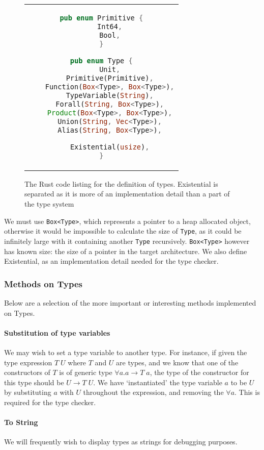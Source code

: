 \begin{figure}[ht]
    \centering
    \begin{tabular}{c}
    \begin{lstlisting}[language=Rust]
pub enum Primitive {
    Int64,
    Bool,
}

pub enum Type {
    Unit,
    Primitive(Primitive),
    Function(Box<Type>, Box<Type>),
    TypeVariable(String),
    Forall(String, Box<Type>),
    Product(Box<Type>, Box<Type>),
    Union(String, Vec<Type>),
    Alias(String, Box<Type>),

    Existential(usize),
}
    \end{lstlisting}
    \end{tabular}
    \caption{The Rust code listing for the definition of types. Existential is separated as it is more of an implementation detail than a part of the type system}
    \label{fig:type_lst}
\end{figure}

We must use \verb|Box<Type>|, which represents a pointer to a heap allocated object, otherwise it would be impossible to calculate the size of \verb|Type|, as it could be infinitely large with it containing another \verb|Type| recursively. \verb|Box<Type>| however has known size: the size of a pointer in the target architecture. We also define Existential, as an implementation detail needed for the type checker. 

\subsubsection{Methods on Types}
Below are a selection of the more important or interesting methods implemented on Types.

\paragraph{Substitution of type variables} We may wish to set a type variable to another type. For instance, if given the type expression \(T \; U\) where \(T\) and \(U\) are types, and we know that one of the constructors of \(T\) is of generic type \(\forall a.a \rightarrow T \; a\), the type of the constructor for this type should be \(U \rightarrow T \; U\). We have `instantiated' the type variable \(a\) to be \(U\) by substituting \(a\) with \(U\) throughout the expression, and removing the \(\forall a\). This is required for the type checker. 

\paragraph{To String} We will frequently wish to display types as strings for debugging purposes. 

